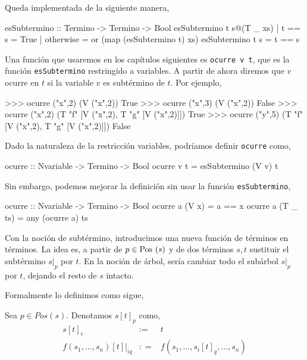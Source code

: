 Queda implementada de la siguiente manera,

\begin{codigo}
esSubtermino :: Termino -> Termino -> Bool
esSubtermino t s@(T _ xs)
    | t == s = True
    | otherwise = or (map (esSubtermino t) xs)
esSubtermino t s = t == s
\end{codigo}

Una función que usaremos en los capítulos siguientes es
\texttt{ocurre v t}, que es la función \texttt{esSubtermino}
restringido a variables. A partir de ahora diremos que $v$ ocurre en
$t$ si la variable $v$ es subtérmino de $t$. Por ejemplo,

\begin{sesion}
>>> ocurre ("x",2) (V ("x",2)) 
True
>>> ocurre ("x",3) (V ("x",2)) 
False
>>> ocurre ("x",2) (T "f" [V ("x",2), T "g" [V ("x",2)]])
True
>>> ocurre ("y",5) (T "f" [V ("x",2), T "g" [V ("x",2)]])
False
\end{sesion}

Dado la naturaleza de la restricción variables, podríamos definir
\texttt{ocurre} como,

\begin{codigo}
ocurre :: Nvariable -> Termino -> Bool
ocurre v t = esSubtermino (V v) t
\end{codigo}

Sin embargo, podemos mejorar la definición sin usar la función
\texttt{esSubtermino},

\begin{codigo}
ocurre :: Nvariable -> Termino -> Bool
ocurre a (V x)    = a == x
ocurre a (T _ ts) = any (ocurre a) ts
\end{codigo}

Con la noción de subtérmino, introducimos una nueva función de
términos en términos. La idea es, a partir de $p\in \mbox{Pos }(s)$ y de dos
términos $s,t$ sustituir el subtérmino $s|_p$ por $t$. En la
noción de árbol, sería cambiar todo el subárbol $s|_p$ por $t$,
dejando el resto de $s$ intacto. 



Formalmente lo definimos como sigue,

\begin{defi}
Sea $p \in Pos(s)$. Denotamos $s[t]_p$ como,
  \begin{equation*}
    \begin{array}{rcl}
      s[t]_\epsilon & :=  & t \\
      f(s_1,\dots,s_n)[t]|_{iq} & : = & f(s_1,\dots,s_i[t]_q,\dots,s_n) \\
    \end{array}
  \end{equation*}
\end{defi}

